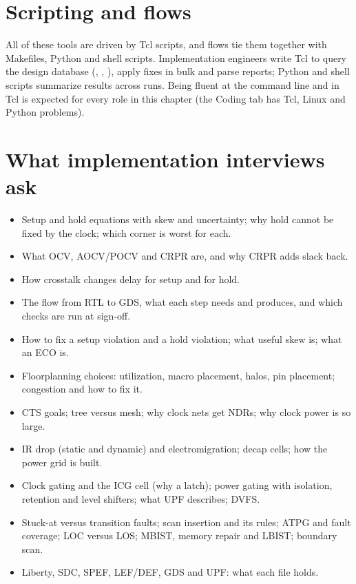 \section{Scripting and flows}

All of these tools are driven by Tcl scripts, and flows tie them together with Makefiles, Python and shell scripts. Implementation engineers write Tcl to query the design database (, , ), apply fixes in bulk and parse reports; Python and shell scripts summarize results across runs. Being fluent at the command line and in Tcl is expected for every role in this chapter (the Coding tab has Tcl, Linux and Python problems).

\section{What implementation interviews ask}

\begin{itemize}
  \item Setup and hold equations with skew and uncertainty; why hold cannot be fixed by the clock; which corner is worst for each.
  \item What OCV, AOCV/POCV and CRPR are, and why CRPR adds slack back.
  \item How crosstalk changes delay for setup and for hold.
  \item The flow from RTL to GDS, what each step needs and produces, and which checks are run at sign-off.
  \item How to fix a setup violation and a hold violation; what useful skew is; what an ECO is.
  \item Floorplanning choices: utilization, macro placement, halos, pin placement; congestion and how to fix it.
  \item CTS goals; tree versus mesh; why clock nets get NDRs; why clock power is so large.
  \item IR drop (static and dynamic) and electromigration; decap cells; how the power grid is built.
  \item Clock gating and the ICG cell (why a latch); power gating with isolation, retention and level shifters; what UPF describes; DVFS.
  \item Stuck-at versus transition faults; scan insertion and its rules; ATPG and fault coverage; LOC versus LOS; MBIST, memory repair and LBIST; boundary scan.
  \item Liberty, SDC, SPEF, LEF/DEF, GDS and UPF: what each file holds.
\end{itemize}

